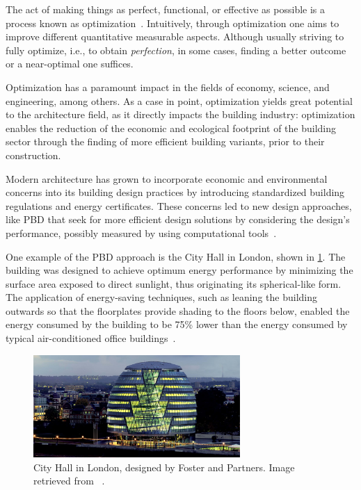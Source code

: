 \cleardoublepage
\label{chap:intro}
	
	The act of making things as perfect, functional, or effective as possible is a process known as optimization~\cite{MerriamWebster2017OptimizationDefinition}. Intuitively, through optimization one aims to improve different quantitative measurable aspects. Although usually striving to fully optimize, i.e., to obtain \textit{perfection}, in some cases, finding a better outcome or a near-optimal one suffices.
	
	Optimization has a paramount impact in the fields of economy, science, and engineering, among others. As a case in point, optimization yields great potential to the architecture field, as it directly impacts the building industry: optimization enables the reduction of the economic and ecological footprint of the building sector through the finding of more efficient building variants, prior to their construction. 
	
	Modern architecture has grown to incorporate economic and environmental concerns into its building design practices by introducing standardized building regulations and energy certificates. These concerns led to new design approaches, like \ac{PBD} that seek for more efficient design solutions by considering the design's performance, possibly measured by using computational tools~\cite{Oxman2006PBD}.
	
	One example of the \ac{PBD} approach is the City Hall in London, shown in \cref{fig:cityhalllondon}. The building was designed to achieve optimum energy performance by minimizing the surface area exposed to direct sunlight, thus originating its spherical-like form. The application of energy-saving techniques, such as leaning the building outwards so that the floorplates provide shading to the floors below, enabled the energy consumed by the building to be 75\% lower than the energy consumed by typical air-conditioned office buildings~\cite{Malkawi2005-a}.
	\begin{figure}[htbp]
		\centering
		\includegraphics[width=0.70\textwidth]{./Images/Introduction/cityhalllondon.jpg}
		\caption{City Hall in London, designed by Foster and Partners. Image retrieved from ~\cite{londoncityhall}.}
		\label{fig:cityhalllondon}
	\end{figure}


